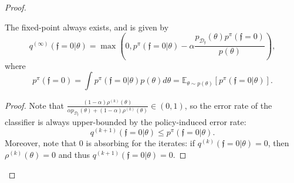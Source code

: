 \documentclass{article} %
\newcommand{\E}{\mathbb{E}}
\newcommand{\feas}{\mathfrak{f}}
\newcommand{\MeasuredCISet}{\mathcal{D}_{\feas{}}}
\begin{document}
\begin{proof}
\begin{prop}
    The fixed-point always exists, and is given by 
    \begin{equation}
        q^{(\infty)}(\feas{}=0 | \theta) = \max \left( 0, p^\pi(\feas{}=0 | \theta) - \alpha \frac{ p_{\MeasuredCISet}(\theta) p^\pi(\feas{}=0) }{ p(\theta) } \right),
    \end{equation}  
    where
    \begin{equation}
        p^\pi(\feas{}=0) = \int p^\pi(\feas{}=0 | \theta) p(\theta) d\theta = \E_{\theta \sim p(\theta)} \left[ p^\pi(\feas{}=0 | \theta) \right].
    \end{equation}
\end{prop}
\begin{proof}
Note that $\frac{ (1-\alpha) \rho^{(k)}(\theta) }{ \alpha p_{\MeasuredCISet}(\theta) + (1-\alpha) \rho^{(k)}(\theta) } \in (0, 1)$, so the error rate of the classifier is always upper-bounded by the policy-induced error rate:
\begin{equation}
    q^{(k+1)}(\feas{}=0 | \theta) \leq p^\pi(\feas{}=0 | \theta).
\end{equation}
Moreover, note that $0$ is absorbing for the iterates: if $q^{(k)}(\feas{}=0 | \theta) = 0$, then $\rho^{(k)}(\theta) = 0$ and thus $q^{(k+1)}(\feas{}=0 | \theta) = 0$.


\end{proof}
\end{proof}
\end{document}
